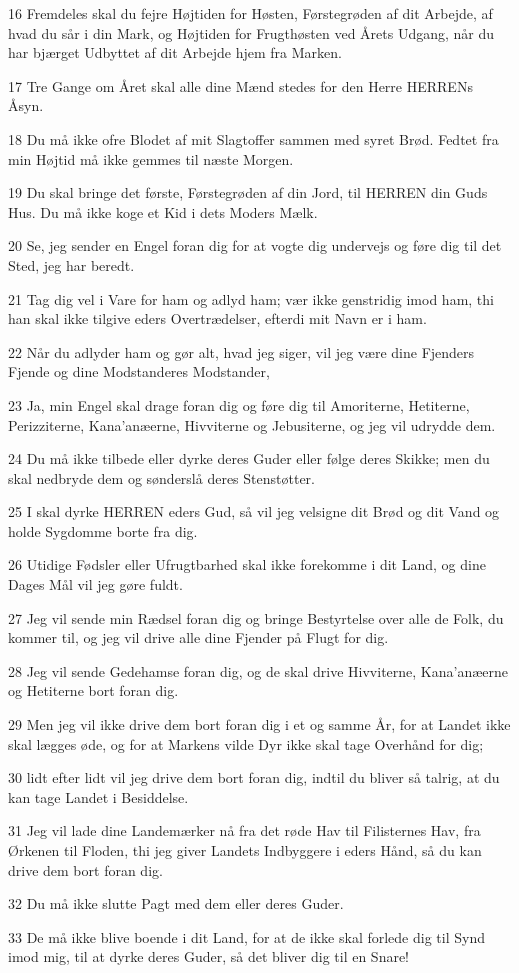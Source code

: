 \par 16 Fremdeles skal du fejre Højtiden for Høsten, Førstegrøden af dit Arbejde, af hvad du sår i din Mark, og Højtiden for Frugthøsten ved Årets Udgang, når du har bjærget Udbyttet af dit Arbejde hjem fra Marken.
\par 17 Tre Gange om Året skal alle dine Mænd stedes for den Herre HERRENs Åsyn.
\par 18 Du må ikke ofre Blodet af mit Slagtoffer sammen med syret Brød. Fedtet fra min Højtid må ikke gemmes til næste Morgen.
\par 19 Du skal bringe det første, Førstegrøden af din Jord, til HERREN din Guds Hus. Du må ikke koge et Kid i dets Moders Mælk.
\par 20 Se, jeg sender en Engel foran dig for at vogte dig undervejs og føre dig til det Sted, jeg har beredt.
\par 21 Tag dig vel i Vare for ham og adlyd ham; vær ikke genstridig imod ham, thi han skal ikke tilgive eders Overtrædelser, efterdi mit Navn er i ham.
\par 22 Når du adlyder ham og gør alt, hvad jeg siger, vil jeg være dine Fjenders Fjende og dine Modstanderes Modstander,
\par 23 Ja, min Engel skal drage foran dig og føre dig til Amoriterne, Hetiterne, Perizziterne, Kana'anæerne, Hivviterne og Jebusiterne, og jeg vil udrydde dem.
\par 24 Du må ikke tilbede eller dyrke deres Guder eller følge deres Skikke; men du skal nedbryde dem og sønderslå deres Stenstøtter.
\par 25 I skal dyrke HERREN eders Gud, så vil jeg velsigne dit Brød og dit Vand og holde Sygdomme borte fra dig.
\par 26 Utidige Fødsler eller Ufrugtbarhed skal ikke forekomme i dit Land, og dine Dages Mål vil jeg gøre fuldt.
\par 27 Jeg vil sende min Rædsel foran dig og bringe Bestyrtelse over alle de Folk, du kommer til, og jeg vil drive alle dine Fjender på Flugt for dig.
\par 28 Jeg vil sende Gedehamse foran dig, og de skal drive Hivviterne, Kana'anæerne og Hetiterne bort foran dig.
\par 29 Men jeg vil ikke drive dem bort foran dig i et og samme År, for at Landet ikke skal lægges øde, og for at Markens vilde Dyr ikke skal tage Overhånd for dig;
\par 30 lidt efter lidt vil jeg drive dem bort foran dig, indtil du bliver så talrig, at du kan tage Landet i Besiddelse.
\par 31 Jeg vil lade dine Landemærker nå fra det røde Hav til Filisternes Hav, fra Ørkenen til Floden, thi jeg giver Landets Indbyggere i eders Hånd, så du kan drive dem bort foran dig.
\par 32 Du må ikke slutte Pagt med dem eller deres Guder.
\par 33 De må ikke blive boende i dit Land, for at de ikke skal forlede dig til Synd imod mig, til at dyrke deres Guder, så det bliver dig til en Snare!

